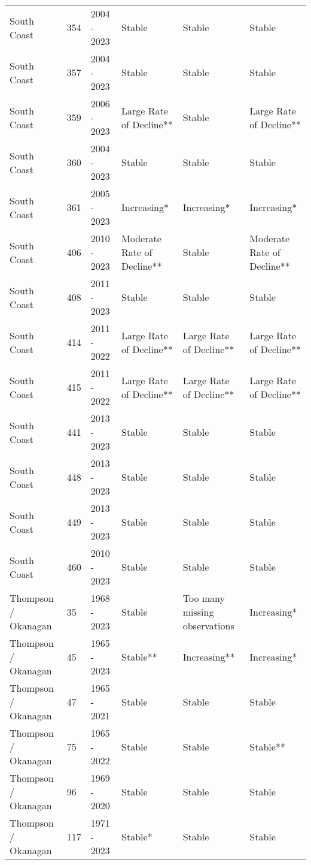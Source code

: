 \documentclass[
]{article}
\begin{document}
\begin{longtable}{lllp{0.9in}p{0.9in}p{0.9in}}
   \rowcolor{stable}South Coast & 354 & 2004 - 2023 & Stable & Stable & Stable \\ 
   \rowcolor{stable}South Coast & 357 & 2004 - 2023 & Stable & Stable & Stable \\ 
   \rowcolor{large}South Coast & 359 & 2006 - 2023 & Large Rate of Decline** & Stable & Large Rate of Decline** \\ 
   \rowcolor{stable}South Coast & 360 & 2004 - 2023 & Stable & Stable & Stable \\ 
   \rowcolor{increasing}South Coast & 361 & 2005 - 2023 & Increasing* & Increasing* & Increasing* \\ 
   \rowcolor{moderate}South Coast & 406 & 2010 - 2023 & Moderate Rate of Decline** & Stable & Moderate Rate of Decline** \\ 
   \rowcolor{stable}South Coast & 408 & 2011 - 2023 & Stable & Stable & Stable \\ 
   \rowcolor{large}South Coast & 414 & 2011 - 2022 & Large Rate of Decline** & Large Rate of Decline** & Large Rate of Decline** \\ 
   \rowcolor{large}South Coast & 415 & 2011 - 2022 & Large Rate of Decline** & Large Rate of Decline** & Large Rate of Decline** \\ 
   \rowcolor{stable}South Coast & 441 & 2013 - 2023 & Stable & Stable & Stable \\ 
   \rowcolor{stable}South Coast & 448 & 2013 - 2023 & Stable & Stable & Stable \\ 
   \rowcolor{stable}South Coast & 449 & 2013 - 2023 & Stable & Stable & Stable \\ 
   \rowcolor{stable}South Coast & 460 & 2010 - 2023 & Stable & Stable & Stable \\ 
   \rowcolor{stable}Thompson / Okanagan & 35 & 1968 - 2023 & Stable & Too many missing observations & Increasing* \\ 
   \rowcolor{stable}Thompson / Okanagan & 45 & 1965 - 2023 & Stable** & Increasing** & Increasing* \\ 
   \rowcolor{stable}Thompson / Okanagan & 47 & 1965 - 2021 & Stable & Stable & Stable \\ 
   \rowcolor{stable}Thompson / Okanagan & 75 & 1965 - 2022 & Stable & Stable & Stable** \\ 
   \rowcolor{stable}Thompson / Okanagan & 96 & 1969 - 2020 & Stable & Stable & Stable \\ 
   \rowcolor{stable}Thompson / Okanagan & 117 & 1971 - 2023 & Stable* & Stable & Stable \\ 

\end{longtable}
\end{document}
